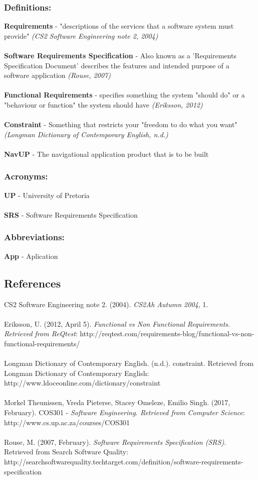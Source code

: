 \documentclass[12pt]{article}
\begin{document}
		\subsubsection{Definitions:}
		\textbf{Requirements} - "descriptions of the services that a software system must provide" \textit{(CS2 Software Engineering note 2, 2004)} \\
		\\ \textbf{Software Requirements Specification} - Also known as a 'Requirements Specification Document' describes the features and intended purpose of a software application \textit{(Rouse, 2007)} \\
		\\ \textbf{Functional Requirements} - specifies something the system "should do" or a "behaviour or function" the system should have \textit{(Eriksson, 2012)} \\
		\\ \textbf{Constraint} - Something that restricts your "freedom to do what you want" \textit{(Longman Dictionary of Contemporary English, n.d.)} \\
		\\ \textbf{NavUP} - The navigational application product that is to be built
		
		\subsubsection{Acronyms:}
		\textbf{UP} - University of Pretoria\\
		\\ \textbf{SRS} - Software Requirements Specification
		
		\subsubsection{Abbreviations:}
		\textbf{App} - Aplication
		
		
	\subsection{References}
	CS2 Software Engineering note 2. (2004). \textit{CS2Ah Autumn 2004}, 1. \\\\
	Eriksson, U. (2012, April 5). \textit{Functional vs Non Functional Requirements. Retrieved from ReQtest}: http://reqtest.com/requirements-blog/functional-vs-non-functional-requirements/ \\\\
	Longman Dictionary of Contemporary English. (n.d.). constraint. Retrieved from Longman Dictionary of Contemporary English: http://www.ldoceonline.com/dictionary/constraint \\\\
	Morkel Theunissen, Vreda Pieterse, Stacey Omeleze, Emilio Singh. (2017, February). COS301 - \textit{Software Engineering. Retrieved from Computer Science}: http://www.cs.up.ac.za/courses/COS301 \\\\
	Rouse, M. (2007, February). \textit{Software Requirements Specification (SRS).} Retrieved from Search Software Quality: http://searchsoftwarequality.techtarget.com/definition/software-requirements-specification
	
\end{document}
